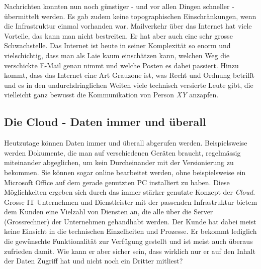 Nachrichten konnten nun noch günstiger - und vor allen Dingen schneller - übermittelt werden. Es gab zudem keine topographischen Einschränkungen, wenn die Infrastruktur einmal vorhanden war. Mailverkehr über das Internet hat viele Vorteile, das kann man nicht bestreiten. Er hat aber auch eine sehr grosse Schwachstelle. Das Internet ist heute in seiner Komplexität so enorm und vielschichtig, dass man als Laie kaum einschätzen kann, welchen Weg die verschickte E-Mail genau nimmt und welche Posten es dabei passiert. Hinzu kommt, dass das Internet eine Art Grauzone ist, was Recht und Ordnung betrifft und es in den undurchdringlichen Weiten viele technisch versierte Leute gibt, die vielleicht ganz bewusst die Kommunikation von Person \textit{XY} anzapfen.

\subsection{Die Cloud - Daten immer und überall}
Heutzutage können Daten immer und überall abgerufen werden. Beispielsweise werden Dokumente, die man auf verschiedenen Geräten braucht, regelmässig miteinander abgeglichen, um kein Durcheinander mit der Versionierung zu bekommen. Sie können sogar online bearbeitet werden, ohne beispielsweise ein Microsoft Office auf dem gerade genutzten PC installiert zu haben. Diese Möglichkeiten ergeben sich durch das immer stärker genutzte Konzept der \textit{Cloud}. Grosse IT-Unternehmen und Dienstleister mit der passenden Infrastruktur bietem dem Kunden eine Vielzahl von Diensten an, die alle über die Server (Grossrechner) der Unternehmen gehandhabt werden. Der Kunde hat dabei meist keine Einsicht in die technischen Einzelheiten und Prozesse. Er bekommt lediglich die gewünschte Funktionalität zur Verfügung gestellt und ist meist auch überaus zufrieden damit. Wie kann er aber sicher sein, dass wirklich nur er auf den Inhalt der Daten Zugriff hat und nicht noch ein Dritter mitliest?

